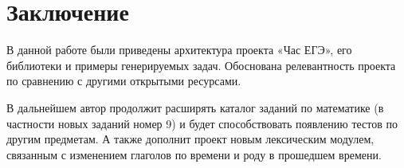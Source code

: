 \section*{Заключение}
В данной работе были приведены архитектура проекта «Час ЕГЭ», его библиотеки
и примеры генерируемых задач. Обоснована релевантность проекта по сравнению 
с другими открытыми ресурсами.

В дальнейшем автор продолжит расширять каталог
заданий по математике (в частности новых заданий номер 9) и будет способствовать появлению тестов по другим предметам.
А также дополнит проект новым лексическим модулем, связанным с изменением
глаголов по времени и роду в прошедшем времени.

